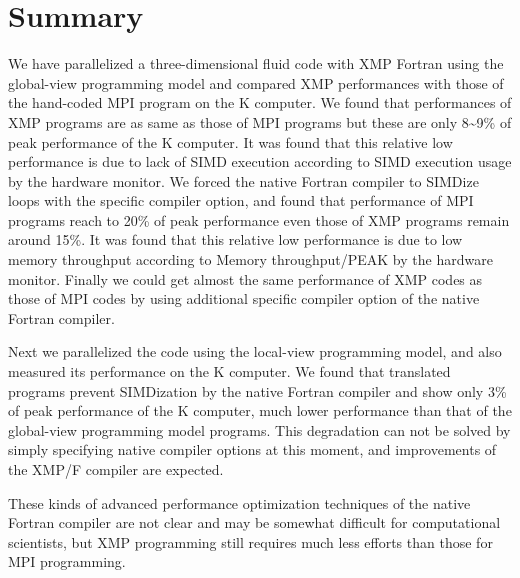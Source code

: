 \documentclass[graybox]{svmult}
\begin{document}
\section{Summary}
We have parallelized a three-dimensional fluid code with XMP Fortran using the global-view programming model and compared XMP performances with those of the hand-coded MPI program on the K computer. We found that performances of XMP programs are as same as those of MPI programs but these are only 8\textasciitilde 9\% of peak performance of the K computer. It was found that this relative low performance is due to lack of SIMD execution according to SIMD execution usage by the hardware monitor. We forced the native Fortran compiler to SIMDize loops with the specific compiler option, and found that performance of MPI programs reach to 20\% of peak performance even those of XMP programs remain around 15\%. It was found that this relative low performance is due to low memory throughput according to Memory throughput/PEAK by the hardware monitor. Finally we could get almost the same performance of XMP codes as those of MPI codes by using additional specific compiler option of the native Fortran compiler. 

Next we parallelized the code using the local-view programming model, and also measured its performance on the K computer. We found that translated programs prevent SIMDization by the native Fortran compiler and show only 3\% of peak performance of the K computer, much lower performance than that of the global-view programming model programs. This degradation can not be solved by simply specifying native compiler options at this moment, and improvements of the XMP/F compiler are expected.

These kinds of advanced performance optimization techniques of the native Fortran compiler are not clear and may be somewhat difficult for computational scientists, but XMP programming still requires much less efforts than those for MPI programming.



\end{document}
